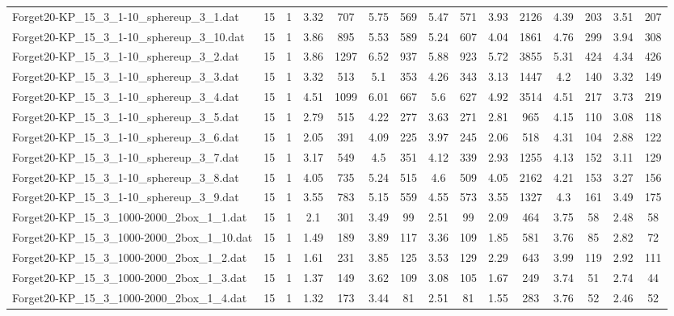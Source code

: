 \begin{table}[!ht]
{\begin{tabular}{lcccccccccccccc}
Forget20-KP\_15\_3\_1-10\_sphereup\_3\_1.dat & 15 & 1 & 3.32 & 707 & 5.75 & 569 & 5.47 & 571 & 3.93 & 2126 & 4.39 & 203 & 3.51 & 207 \\
Forget20-KP\_15\_3\_1-10\_sphereup\_3\_10.dat & 15 & 1 & 3.86 & 895 & 5.53 & 589 & 5.24 & 607 & 4.04 & 1861 & 4.76 & 299 & 3.94 & 308 \\
Forget20-KP\_15\_3\_1-10\_sphereup\_3\_2.dat & 15 & 1 & 3.86 & 1297 & 6.52 & 937 & 5.88 & 923 & 5.72 & 3855 & 5.31 & 424 & 4.34 & 426 \\
Forget20-KP\_15\_3\_1-10\_sphereup\_3\_3.dat & 15 & 1 & 3.32 & 513 & 5.1 & 353 & 4.26 & 343 & 3.13 & 1447 & 4.2 & 140 & 3.32 & 149 \\
Forget20-KP\_15\_3\_1-10\_sphereup\_3\_4.dat & 15 & 1 & 4.51 & 1099 & 6.01 & 667 & 5.6 & 627 & 4.92 & 3514 & 4.51 & 217 & 3.73 & 219 \\
Forget20-KP\_15\_3\_1-10\_sphereup\_3\_5.dat & 15 & 1 & 2.79 & 515 & 4.22 & 277 & 3.63 & 271 & 2.81 & 965 & 4.15 & 110 & 3.08 & 118 \\
Forget20-KP\_15\_3\_1-10\_sphereup\_3\_6.dat & 15 & 1 & 2.05 & 391 & 4.09 & 225 & 3.97 & 245 & 2.06 & 518 & 4.31 & 104 & 2.88 & 122 \\
Forget20-KP\_15\_3\_1-10\_sphereup\_3\_7.dat & 15 & 1 & 3.17 & 549 & 4.5 & 351 & 4.12 & 339 & 2.93 & 1255 & 4.13 & 152 & 3.11 & 129 \\
Forget20-KP\_15\_3\_1-10\_sphereup\_3\_8.dat & 15 & 1 & 4.05 & 735 & 5.24 & 515 & 4.6 & 509 & 4.05 & 2162 & 4.21 & 153 & 3.27 & 156 \\
Forget20-KP\_15\_3\_1-10\_sphereup\_3\_9.dat & 15 & 1 & 3.55 & 783 & 5.15 & 559 & 4.55 & 573 & 3.55 & 1327 & 4.3 & 161 & 3.49 & 175 \\
Forget20-KP\_15\_3\_1000-2000\_2box\_1\_1.dat & 15 & 1 & 2.1 & 301 & 3.49 & 99 & 2.51 & 99 & 2.09 & 464 & 3.75 & 58 & 2.48 & 58 \\
Forget20-KP\_15\_3\_1000-2000\_2box\_1\_10.dat & 15 & 1 & 1.49 & 189 & 3.89 & 117 & 3.36 & 109 & 1.85 & 581 & 3.76 & 85 & 2.82 & 72 \\
Forget20-KP\_15\_3\_1000-2000\_2box\_1\_2.dat & 15 & 1 & 1.61 & 231 & 3.85 & 125 & 3.53 & 129 & 2.29 & 643 & 3.99 & 119 & 2.92 & 111 \\
Forget20-KP\_15\_3\_1000-2000\_2box\_1\_3.dat & 15 & 1 & 1.37 & 149 & 3.62 & 109 & 3.08 & 105 & 1.67 & 249 & 3.74 & 51 & 2.74 & 44 \\
Forget20-KP\_15\_3\_1000-2000\_2box\_1\_4.dat & 15 & 1 & 1.32 & 173 & 3.44 & 81 & 2.51 & 81 & 1.55 & 283 & 3.76 & 52 & 2.46 & 52 \\

\end{tabular}}
\end{table}
